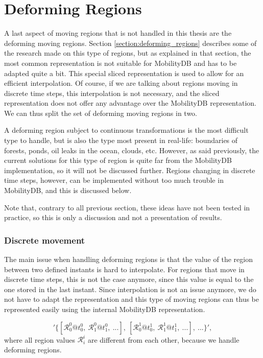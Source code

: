 
\section{Deforming Regions}
\label{section:deforming}

A last aspect of moving regions that is not handled in this thesis are the deforming moving regions. Section \ref{section:deforming_regions} describes some of the research made on this type of regions, but as explained in that section, the most common representation is not suitable for MobilityDB and has to be adapted quite a bit. This special sliced representation is used to allow for an efficient interpolation. Of course, if we are talking about regions moving in discrete time steps, this interpolation is not necessary, and the sliced representation does not offer any advantage over the MobilityDB representation. We can thus split the set of deforming moving regions in two.

A deforming region subject to continuous transformations is the most difficult type to handle, but is also the type most present in real-life: boundaries of forests, ponds, oil leaks in the ocean, clouds, etc. However, as said previously, the current solutions for this type of region is quite far from the MobilityDB implementation, so it will not be discussed further. Regions changing in discrete time steps, however, can be implemented without too much trouble in MobilityDB, and this is discussed below.

Note that, contrary to all previous section, these ideas have not been tested in practice, so this is only a discussion and not a presentation of results.

\subsubsection{Discrete movement}

The main issue when handling deforming regions is that the value of the region between two defined instants is hard to interpolate. For regions that move in discrete time steps, this is not the case anymore, since this value is equal to the one stored in the last instant. Since interpolation is not an issue anymore, we do not have to adapt the representation and this type of moving regions can thus be represented easily using the internal MobilityDB representation. 

\[
    '\{[\mathcal{R}_0^0@t_0^0,\ \mathcal{R}_1^0@t_1^0,\ ...],\ [\mathcal{R}_0^1@t_0^1,\ \mathcal{R}_1^1@t_1^1,\ ...],\ ...\}', 
\]
where all region values $\mathcal{R}_i^i$ are different from each other, because we handle deforming regions.

